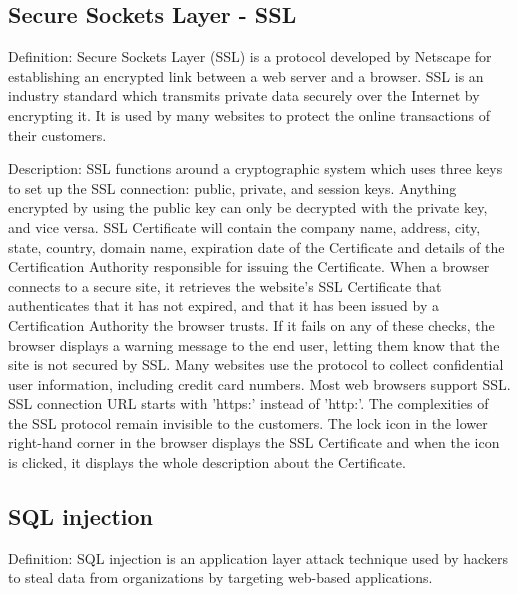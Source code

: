 \documentclass[a4paper, 12pt]{book}
\begin{document}
\subsection{Secure Sockets Layer - SSL}
Definition: Secure Sockets Layer (SSL) is a protocol developed by Netscape for establishing an encrypted link between a web server and a browser. SSL is an industry standard which transmits private data securely over the Internet by encrypting it. It is used by many websites to protect the online transactions of their customers.

Description: SSL functions around a cryptographic system which uses three keys to set up the SSL connection: public, private, and session keys. Anything encrypted by using the public key can only be decrypted with the private key, and vice versa. SSL Certificate will contain the company name, address, city, state, country, domain name, expiration date of the Certificate and details of the Certification Authority responsible for issuing the Certificate. When a browser connects to a secure site, it retrieves the website's SSL Certificate that authenticates that it has not expired, and that it has been issued by a Certification Authority the browser trusts. If it fails on any of these checks, the browser displays a warning message to the end user, letting them know that the site is not secured by SSL. Many websites use the protocol to collect confidential user information, including credit card numbers. Most web browsers support SSL. SSL connection URL starts with 'https:' instead of 'http:'. The complexities of the SSL protocol remain invisible to the customers. The lock icon in the lower right-hand corner in the browser displays the SSL Certificate and when the icon is clicked, it displays the whole description about the Certificate.

\subsection{SQL injection}
Definition: SQL injection is an application layer attack technique used by hackers to steal data from organizations by targeting web-based applications.
\end{document}
